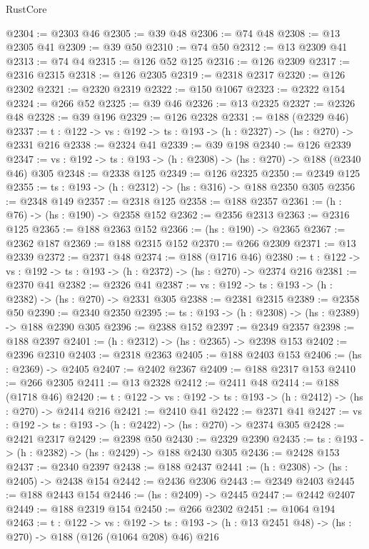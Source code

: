 \begin{lexlean}{RustCore}
\begin{coremodule}
@2304 := @2303 @46
@2305 := @39 @48
@2306 := @74 @48
@2308 := @13 @2305 @41
@2309 := @39 @50
@2310 := @74 @50
@2312 := @13 @2309 @41
@2313 := @74 @4
@2315 := @126 @52 @125
@2316 := @126 @2309
@2317 := @2316 @2315
@2318 := @126 @2305
@2319 := @2318 @2317
@2320 := @126 @2302
@2321 := @2320 @2319
@2322 := @150 @1067
@2323 := @2322 @154
@2324 := @266 @52
@2325 := @39 @46
@2326 := @13 @2325
@2327 := @2326 @48
@2328 := @39 @196
@2329 := @126 @2328
@2331 := @188 (@2329 @46)
@2337 := {t : @122} -> {vs : @192} -> {ts : @193} -> (h : @2327) -> (hs : @270) -> @2331 @216
@2338 := @2324 @41
@2339 := @39 @198
@2340 := @126 @2339
@2347 := {vs : @192} -> {ts : @193} -> (h : @2308) -> (hs : @270) -> @188 (@2340 @46) @305
@2348 := @2338 @125
@2349 := @126 @2325
@2350 := @2349 @125
@2355 := {ts : @193} -> (h : @2312) -> (hs : @316) -> @188 @2350 @305
@2356 := @2348 @149
@2357 := @2318 @125
@2358 := @188 @2357
@2361 := (h : @76) -> (hs : @190) -> @2358 @152
@2362 := @2356 @2313
@2363 := @2316 @125
@2365 := @188 @2363 @152
@2366 := (hs : @190) -> @2365
@2367 := @2362 @187
@2369 := @188 @2315 @152
@2370 := @266 @2309
@2371 := @13 @2339
@2372 := @2371 @48
@2374 := @188 (@1716 @46)
@2380 := {t : @122} -> {vs : @192} -> {ts : @193} -> (h : @2372) -> (hs : @270) -> @2374 @216
@2381 := @2370 @41
@2382 := @2326 @41
@2387 := {vs : @192} -> {ts : @193} -> (h : @2382) -> (hs : @270) -> @2331 @305
@2388 := @2381 @2315
@2389 := @2358 @50
@2390 := @2340 @2350
@2395 := {ts : @193} -> (h : @2308) -> (hs : @2389) -> @188 @2390 @305
@2396 := @2388 @152
@2397 := @2349 @2357
@2398 := @188 @2397
@2401 := (h : @2312) -> (hs : @2365) -> @2398 @153
@2402 := @2396 @2310
@2403 := @2318 @2363
@2405 := @188 @2403 @153
@2406 := (hs : @2369) -> @2405
@2407 := @2402 @2367
@2409 := @188 @2317 @153
@2410 := @266 @2305
@2411 := @13 @2328
@2412 := @2411 @48
@2414 := @188 (@1718 @46)
@2420 := {t : @122} -> {vs : @192} -> {ts : @193} -> (h : @2412) -> (hs : @270) -> @2414 @216
@2421 := @2410 @41
@2422 := @2371 @41
@2427 := {vs : @192} -> {ts : @193} -> (h : @2422) -> (hs : @270) -> @2374 @305
@2428 := @2421 @2317
@2429 := @2398 @50
@2430 := @2329 @2390
@2435 := {ts : @193} -> (h : @2382) -> (hs : @2429) -> @188 @2430 @305
@2436 := @2428 @153
@2437 := @2340 @2397
@2438 := @188 @2437
@2441 := (h : @2308) -> (hs : @2405) -> @2438 @154
@2442 := @2436 @2306
@2443 := @2349 @2403
@2445 := @188 @2443 @154
@2446 := (hs : @2409) -> @2445
@2447 := @2442 @2407
@2449 := @188 @2319 @154
@2450 := @266 @2302
@2451 := @1064 @194
@2463 := {t : @122} ->
  {vs : @192} ->
  {ts : @193} -> (h : @13 @2451 @48) -> (hs : @270) -> @188 (@126 (@1064 @208) @46) @216

\end{coremodule}
\end{lexlean}
